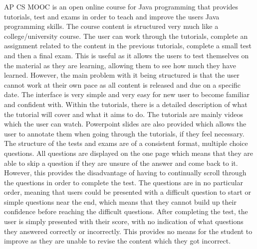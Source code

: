 \documentclass{article}
\begin{document}
AP CS MOOC is an open online course for Java programming that provides tutorials, test and exams in order to teach and improve the users Java programming skills. The course content is structured very much like a college/university course. The user can work through the tutorials, complete an assignment related to the content in the previous tutorials, complete a small test and then a final exam. This is useful as it allows the users to test themselves on the material as they are learning, allowing them to see how much they have learned. However, the main problem with it being structured is that the user cannot work at their own pace as all content is released and due on a specific date. The interface is very simple and very easy for new user to become familiar and confident with. Within the tutorials, there is a detailed description of what the tutorial will cover and what it aims to do. The tutorials are mainly videos which the user can watch. Powerpoint slides are also provided which allows the user to annotate them when going through the tutorials, if they feel necessary. The structure of the tests and exams are of a consistent format, multiple choice questions. All questions are displayed on the one page which means that they are able to skip a question if they are unsure of the answer and come back to it. However, this provides the disadvantage of having to continually scroll through the questions in order to complete the test. The questions are in no particular order, meaning that users could be presented with a difficult question to start or simple questions near the end, which means that they cannot build up their confidence before reaching the difficult questions. After completing the test, the user is simply presented with their score, with no indication of what questions they answered correctly or incorrectly. This provides no means for the student to improve as they are unable to revise the content which they got incorrect.\\
\end{document}
